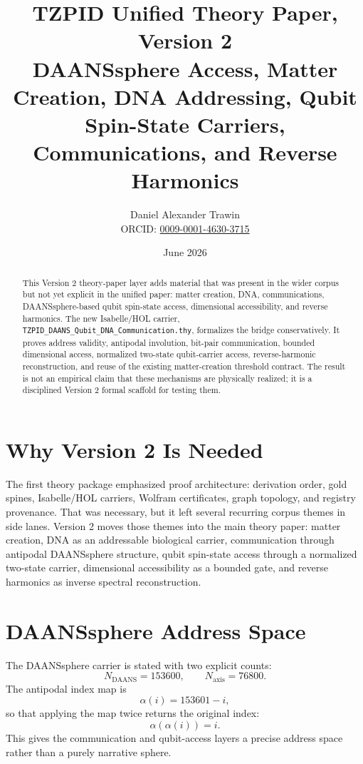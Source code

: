 \documentclass[11pt]{article}
\title{TZPID Unified Theory Paper, Version 2\\[0.5em]
\large DAANSsphere Access, Matter Creation, DNA Addressing, Qubit Spin-State Carriers, Communications, and Reverse Harmonics}
\author{Daniel Alexander Trawin\\
\small ORCID: \href{https://orcid.org/0009-0001-4630-3715}{0009-0001-4630-3715}}
\date{June 2026}
\theoremstyle{remark}
\begin{document}
\maketitle

\begin{abstract}
This Version 2 theory-paper layer adds material that was present in the wider corpus but not yet explicit in the unified paper: matter creation, DNA, communications, DAANSsphere-based qubit spin-state access, dimensional accessibility, and reverse harmonics.  The new Isabelle/HOL carrier, \texttt{TZPID\_DAANS\_Qubit\_DNA\_Communication.thy}, formalizes the bridge conservatively.  It proves address validity, antipodal involution, bit-pair communication, bounded dimensional access, normalized two-state qubit-carrier access, reverse-harmonic reconstruction, and reuse of the existing matter-creation threshold contract.  The result is not an empirical claim that these mechanisms are physically realized; it is a disciplined Version 2 formal scaffold for testing them.
\end{abstract}

\section{Why Version 2 Is Needed}

The first theory package emphasized proof architecture: derivation order, gold spines, Isabelle/HOL carriers, Wolfram certificates, graph topology, and registry provenance.  That was necessary, but it left several recurring corpus themes in side lanes.  Version 2 moves those themes into the main theory paper: matter creation, DNA as an addressable biological carrier, communication through antipodal DAANSsphere structure, qubit spin-state access through a normalized two-state carrier, dimensional accessibility as a bounded gate, and reverse harmonics as inverse spectral reconstruction.

\section{DAANSsphere Address Space}

The DAANSsphere carrier is stated with two explicit counts:
\[
N_{\mathrm{DAANS}}=153600,\qquad N_{\mathrm{axis}}=76800.
\]
The antipodal index map is
\[
\alpha(i)=153601-i,
\]
so that applying the map twice returns the original index:
\[
\alpha(\alpha(i))=i.
\]
This gives the communication and qubit-access layers a precise address space rather than a purely narrative sphere.
\end{document}
